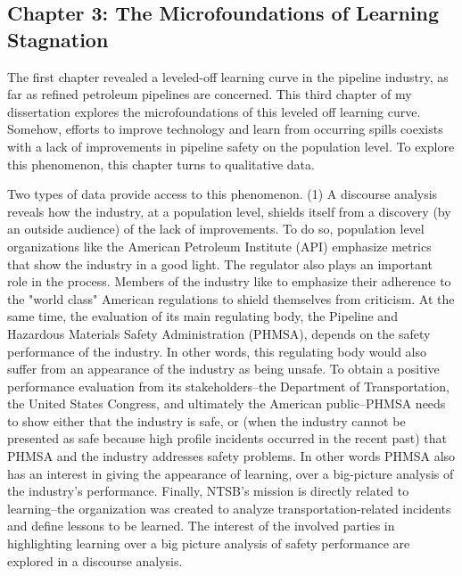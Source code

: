 \subsection{Chapter 3: The Microfoundations of Learning Stagnation}

The first chapter revealed a leveled-off learning curve in the pipeline industry, as far as refined petroleum pipelines are concerned. This third chapter of my dissertation explores the microfoundations of this leveled off learning curve. Somehow, efforts to improve technology and learn from occurring spills coexists with a lack of improvements in pipeline safety on the population level. To explore this phenomenon, this chapter turns to qualitative data.

Two types of data provide access to this phenomenon. (1) A discourse analysis reveals how the industry, at a population level, shields itself from a discovery (by an outside audience) of the lack of improvements. To do so, population level organizations like the American Petroleum Institute (API) emphasize metrics that show the industry in a good light. The regulator also plays an important role in the process. Members of the industry like to emphasize their adherence to the "world class" American regulations to shield themselves from criticism. At the same time, the evaluation of its main regulating body, the Pipeline and Hazardous Materials Safety Administration (PHMSA), depends on the safety performance of the industry. In other words, this regulating body would also suffer from an appearance of the industry as being unsafe. To obtain a positive performance evaluation from its stakeholders--the Department of Transportation, the United States Congress, and ultimately the American public--PHMSA needs to show either that the industry is safe, or (when the industry cannot be presented as safe because high profile incidents occurred in the recent past) that PHMSA and the industry addresses safety problems. In other words PHMSA also has an interest in giving the appearance of learning, over a big-picture analysis of the industry's performance. Finally, NTSB's mission is directly related to learning--the organization was created to analyze transportation-related incidents and define lessons to be learned. The interest of the involved parties in highlighting learning over a big picture analysis of safety performance are explored in a discourse analysis.

